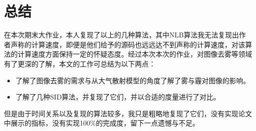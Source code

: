 \section{总结}
\label{s5}
在本次期末大作业，本人复现了以上的几种算法，其中NLB算法\cite{raikwar.tapaswi2020}我无法复现出作者声称的计算速度，即便是他们给予的源码也远远达不到声称的计算速度，对该算法的计算速度方面保持一定的怀疑态度。经过本次本次的作业，对图像去雾等领域有了更深的了解，本文的工作可总结为以下两点：
\begin{itemize}
    \item 了解了图像去雾的需求与从大气散射模型的角度了解了雾与霾对图像的影响。

    \item 了解了几种SID算法，并复现了它们，并以合适的度量进行了对比。
\end{itemize}

但是由于时间关系以及复现的算法较多，我只是粗略地复现了它们，没有实现论文中展示的指标，没有实现100\%的完成度，留下一点遗憾与不足。